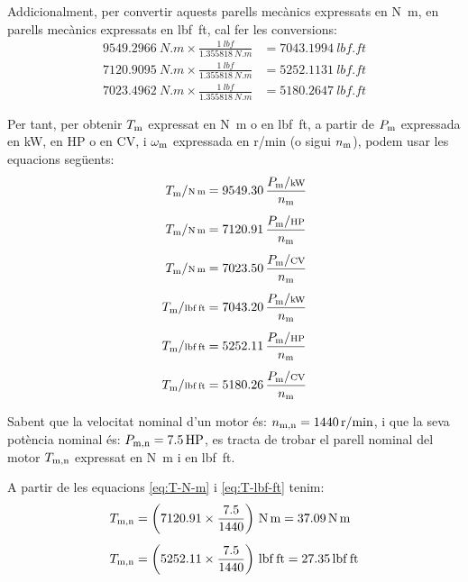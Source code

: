 Addicionalment, per  convertir aquests parells mecànics expressats en \unit{N.m}, en parells mecànics expressats en \unit{lbf.ft}, cal  fer les conversions:
\begin{subequations}
\begin{align}
    \qty{9549,2966}{N.m} \times \frac{\qty{1}{lbf}}{\qty{1,355818}{N.m}} &= \qty{7043,1994}{lbf.ft} \\[1ex]
    \qty{7120,9095}{N.m} \times \frac{\qty{1}{lbf}}{\qty{1,355818}{N.m}} &= \qty{5252,1131}{lbf.ft} \\[1ex]
    \qty{7023,4962}{N.m} \times \frac{\qty{1}{lbf}}{\qty{1,355818}{N.m}} &= \qty{5180,2647}{lbf.ft}
\end{align}
\end{subequations}

Per tant, per  obtenir $T_\mathrm{m}$ expressat en \unit{N.m} o en \unit{lbf.ft}, a partir de $P_\mathrm{m}$ expressada en kW, en HP o en CV, i $\omega_\mathrm{m}$ expressada en \unit{r/min} (o sigui $n_\mathrm{m}$),  podem usar les equacions següents:
\begin{subequations}
\begin{align}
    T\ped{m}/{\scriptstyle \unit{N.m}} &= \num{9549,30}\,  \frac{P\ped{m}/{\scriptstyle \unit{kW}}}{n\ped{m}} \\[1ex]
    T\ped{m}/{\scriptstyle \unit{N.m}} &= \num{7120,91}\,  \frac{P\ped{m}/{\scriptstyle \unit{HP}}}{n\ped{m}}\label{eq:T-N-m} \\[1ex]
    T\ped{m}/{\scriptstyle \unit{N.m}} &= \num{7023,50}\,  \frac{P\ped{m}/{\scriptstyle \unit{CV}}}{n\ped{m}} \\[1ex]
    T\ped{m}/{\scriptstyle \unit{lbf.ft}} &= \num{7043,20}\,  \frac{P\ped{m}/{\scriptstyle \unit{kW}}}{n\ped{m}} \\[1ex]
    T\ped{m}/{\scriptstyle \unit{lbf.ft}} &= \num{5252,11}\,  \frac{P\ped{m}/{\scriptstyle \unit{HP}}}{n\ped{m}}\label{eq:T-lbf-ft} \\[1ex]
    T\ped{m}/{\scriptstyle \unit{lbf.ft}} &= \num{5180,26}\,  \frac{P\ped{m}/{\scriptstyle \unit{CV}}}{n\ped{m}}
\end{align}
\end{subequations}


\begin{exemple}
    Sabent que la velocitat nominal d'un motor és: $n_\mathrm{m,n} = \qty{1440}{r/min}$, i que la seva potència nominal és: $P_\mathrm{m,n} = \qty{7,5}{HP}$,   es tracta de trobar el parell nominal del motor $T_\mathrm{m,n}$ expressat en \unit{N.m} i en \unit{lbf.ft}.

    A partir de les equacions  \eqref{eq:T-N-m} i \eqref{eq:T-lbf-ft} tenim:
    \begin{align*}
      T\ped{m,n} &= \left(\num{7120,91} \times \frac{\num{7,5}}{1440}\right)
      \,\unit{N.m} = \qty{37,09}{N.m} \\[1ex]
      T\ped{m,n} &= \left(\num{5252,11} \times \frac{\num{7,5}}{1440}\right)
      \,\unit{lbf.ft} = \qty{27,35}{lbf.ft}
    \end{align*}
\end{exemple}


